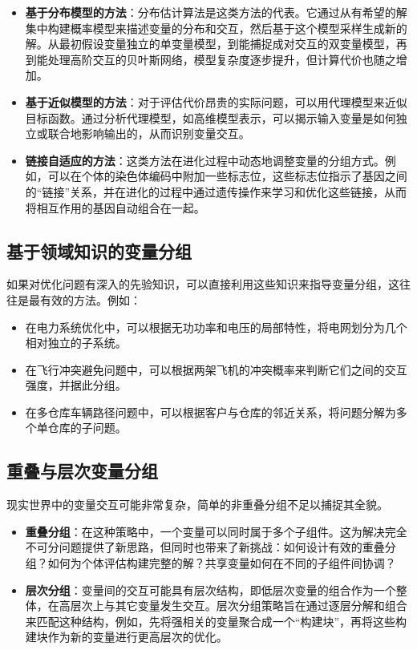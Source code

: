 \begin{itemize}
            \item \textbf{基于分布模型的方法}：分布估计算法是这类方法的代表。它通过从有希望的解集中构建概率模型来描述变量的分布和交互，然后基于这个模型采样生成新的解。从最初假设变量独立的单变量模型，到能捕捉成对交互的双变量模型，再到能处理高阶交互的贝叶斯网络，模型复杂度逐步提升，但计算代价也随之增加。
            \item \textbf{基于近似模型的方法}：对于评估代价昂贵的实际问题，可以用代理模型来近似目标函数。通过分析代理模型，如高维模型表示，可以揭示输入变量是如何独立或联合地影响输出的，从而识别变量交互。
            \item \textbf{链接自适应的方法}：这类方法在进化过程中动态地调整变量的分组方式。例如，可以在个体的染色体编码中附加一些标志位，这些标志位指示了基因之间的“链接”关系，并在进化的过程中通过遗传操作来学习和优化这些链接，从而将相互作用的基因自动组合在一起。
        \end{itemize}

\subsection{基于领域知识的变量分组}
如果对优化问题有深入的先验知识，可以直接利用这些知识来指导变量分组，这往往是最有效的方法。例如：
    \begin{itemize}
        \item 在电力系统优化中，可以根据无功功率和电压的局部特性，将电网划分为几个相对独立的子系统。
        \item 在飞行冲突避免问题中，可以根据两架飞机的冲突概率来判断它们之间的交互强度，并据此分组。
        \item 在多仓库车辆路径问题中，可以根据客户与仓库的邻近关系，将问题分解为多个单仓库的子问题。
    \end{itemize}

\subsection{重叠与层次变量分组}
现实世界中的变量交互可能非常复杂，简单的非重叠分组不足以捕捉其全貌。
\begin{itemize}
    \item \textbf{重叠分组}：在这种策略中，一个变量可以同时属于多个子组件。这为解决完全不可分问题提供了新思路，但同时也带来了新挑战：如何设计有效的重叠分组？如何为个体评估构建完整的解？共享变量如何在不同的子组件间协调？
    \item \textbf{层次分组}：变量间的交互可能具有层次结构，即低层次变量的组合作为一个整体，在高层次上与其它变量发生交互。层次分组策略旨在通过逐层分解和组合来匹配这种结构，例如，先将强相关的变量聚合成一个“构建块”，再将这些构建块作为新的变量进行更高层次的优化。
\end{itemize}

